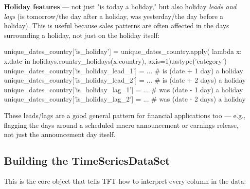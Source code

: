 \documentclass[12pt,openany]{book}
\theoremstyle{definition}
\theoremstyle{remark}
\begin{document}
\textbf{Holiday features} --- not just "is today a holiday," but also holiday \emph{leads and lags} (is tomorrow/the day after a holiday, was yesterday/the day before a holiday). This is useful because sales patterns are often affected in the days surrounding a holiday, not just on the holiday itself:

\begin{python}
unique_dates_country['is_holiday'] = unique_dates_country.apply(
    lambda x: x.date in holidays.country_holidays(x.country), axis=1).astype('category')
unique_dates_country['is_holiday_lead_1'] = ...   # is (date + 1 day) a holiday
unique_dates_country['is_holiday_lead_2'] = ...   # is (date + 2 days) a holiday
unique_dates_country['is_holiday_lag_1']  = ...   # was (date - 1 day) a holiday
unique_dates_country['is_holiday_lag_2']  = ...   # was (date - 2 days) a holiday
\end{python}

These leads/lags are a good general pattern for financial applications too --- e.g., flagging the days around a scheduled macro announcement or earnings release, not just the announcement day itself.

\subsection{Building the TimeSeriesDataSet}

This is the core object that tells TFT how to interpret every column in the data:
\end{document}
